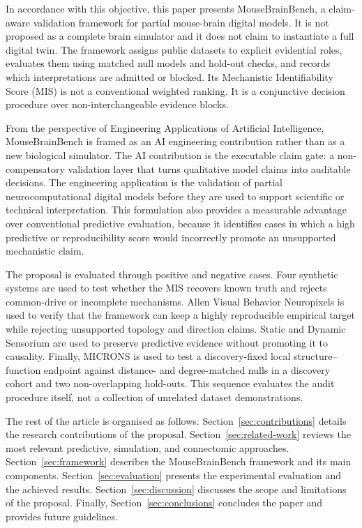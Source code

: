 In accordance with this objective, this paper presents MouseBrainBench, a
claim-aware validation framework for partial mouse-brain digital models. It is
not proposed as a complete brain simulator and it does not claim to instantiate
a full digital twin. The framework assigns public datasets to explicit
evidential roles, evaluates them using matched null models and hold-out checks,
and records which interpretations are admitted or blocked. Its Mechanistic
Identifiability Score (MIS) is not a conventional weighted ranking. It is a
conjunctive decision procedure over non-interchangeable evidence blocks.

From the perspective of Engineering Applications of Artificial Intelligence, MouseBrainBench is framed as an AI engineering contribution rather than as a new biological simulator. The AI contribution is the executable claim gate: a non-compensatory validation layer that turns qualitative model claims into auditable decisions. The engineering application is the validation of partial neurocomputational digital models before they are used to support scientific or technical interpretation. This formulation also provides a measurable advantage over conventional predictive evaluation, because it identifies cases in which a high predictive or reproducibility score would incorrectly promote an unsupported mechanistic claim.

The proposal is evaluated through positive and negative cases. Four synthetic
systems are used to test whether the MIS recovers known truth and rejects
common-drive or incomplete mechanisms. Allen Visual Behavior Neuropixels is used
to verify that the framework can keep a highly reproducible empirical target
while rejecting unsupported topology and direction claims. Static and Dynamic
Sensorium are used to preserve predictive evidence without promoting it to
causality. Finally, MICRONS is used to test a discovery-fixed local
structure--function endpoint against distance- and degree-matched nulls in a
discovery cohort and two non-overlapping hold-outs. This sequence evaluates the
audit procedure itself, not a collection of unrelated dataset demonstrations.

The rest of the article is organised as follows. Section~\ref{sec:contributions}
details the research contributions of the proposal. Section~\ref{sec:related-work}
reviews the most relevant predictive, simulation, and connectomic approaches.
Section~\ref{sec:framework} describes the MouseBrainBench framework and its
main components. Section~\ref{sec:evaluation} presents the experimental
evaluation and the achieved results. Section~\ref{sec:discussion} discusses the
scope and limitations of the proposal. Finally, Section~\ref{sec:conclusions}
concludes the paper and provides future guidelines.
